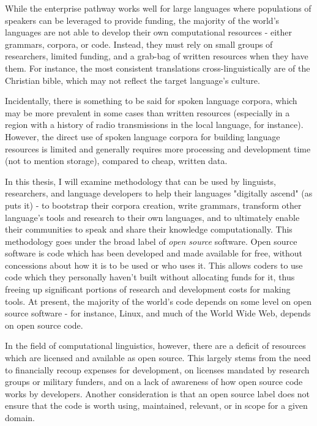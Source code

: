 While the enterprise pathway works well for large languages where populations of speakers can be leveraged to provide funding, the majority of the world's languages are not able to develop their own computational resources - either grammars, corpora, or code. Instead, they must rely on small groups of researchers, limited funding, and a grab-bag of written resources when they have them. For instance, the most consistent translations cross-linguistically are of the Christian bible, which may not reflect the target language's culture.

Incidentally, there is something to be said for spoken language corpora, which may be more prevalent in some cases than written resources (especially in a region with a history of radio transmissions in the local language, for instance). However, the direct use of spoken language corpora for building language resources is limited and generally requires more processing and development time (not to mention storage), compared to cheap, written data.


In this thesis, I will examine methodology that can be used by linguists, researchers, and language developers to help their languages "digitally ascend" (as \citet{kornai2013digital} puts it) - to bootstrap their corpora creation, write grammars, transform other language's tools and research to their own languages, and to ultimately enable their communities to speak and share their knowledge computationally. This methodology goes under the broad label of \textit{open source} software. Open source software is code which has been developed and made available for free, without concessions about how it is to be used or who uses it. This allows coders to use code which they personally haven't built without allocating funds for it, thus freeing up significant portions of research and development costs for making tools. At present, the majority of the world's code depends on some level on open source software - for instance, Linux, and much of the World Wide Web, depends on open source code.

In the field of computational linguistics, however, there are a deficit of resources which are licensed and available as open source. This largely stems from the need to financially recoup expenses for development, on licenses mandated by research groups or military funders, and on a lack of awareness of how open source code works by developers. Another consideration is that an open source label does not ensure that the code is worth using, maintained, relevant, or in scope for a given domain.

